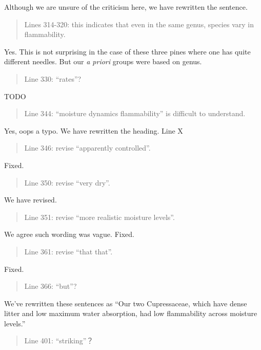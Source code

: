 \documentclass[letterpaper, 12pt]{letter}
\begin{document}
\begin{letter}{}
Although we are unsure of the criticism here, we have rewritten the sentence.

\begin{quote}
  Lines 314-320: this indicates that even in the same genus, species vary in
  flammability.
\end{quote}

Yes. This is not surprising in the case of these three pines where one has
quite different needles. But our \emph{a priori} groups were based on genus.

\begin{quote}
Line 330: “rates”?
\end{quote}

TODO

\begin{quote}
  Line 344: “moisture dynamics flammability” is difficult to understand.
\end{quote}

Yes, oops a typo. We have rewritten the heading. Line X

\begin{quote}
  Line 346: revise “apparently controlled”.
\end{quote}

Fixed.

\begin{quote}
  Line 350: revise “very dry”.
\end{quote}

We have revised.

\begin{quote}
Line 351: revise “more realistic moisture levels”.
\end{quote}

We agree such wording was vague. Fixed.

\begin{quote}
  Line 361: revise “that that”.
\end{quote}

Fixed.

\begin{quote}
  Line 366: “but”?
\end{quote}

We've rewritten these sentences as ``Our two Cupressaceae, which have dense
litter and low maximum water absorption, had low flammability across moisture
levels.''

\begin{quote}
  Line 401: “striking”？
\end{quote}


\end{letter}
\end{document}

